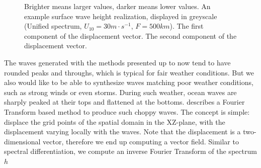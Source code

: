 \begin{figure}
{ }
 \hfill
\caption{
Brighter means larger values, darker means lower values.
 An example surface wave height
realization, displayed in greyscale (Unified spectrum, $U_{10}=30m\cdot s^{-1}$, $F=500km$).
 The first component of the displacement vector.
 The second component of the displacement vector.
}
\label{fig:displacements}
\end{figure}
%
The waves generated with the methods presented up to now tend to have rounded peaks and throughs,
which is typical for fair weather conditions. But we also would like to be able to synthesize waves
matching poor weather conditions, such as strong winds or even storms. During such weather, ocean waves
are sharply peaked at their tops and flattened at the bottoms. \citet{course:simulatingocean}
describes a Fourier Transform based method to produce such choppy waves. The concept is simple: displace
the grid points of the spatial domain in the XZ-plane, with the displacement varying locally with the waves.
Note that the displacement is a two-dimensional vector, therefore we end up computing a vector field.
Similar to spectral differentiation, we compute an inverse Fourier Transform of the spectrum $h$
